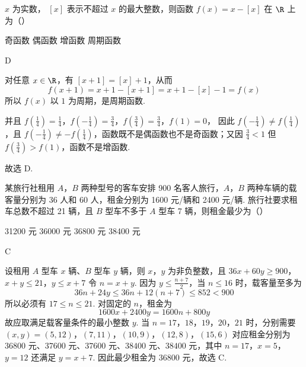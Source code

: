 \begin{problem}
\(x\) 为实数， \([x]\) 表示不超过 \(x\) 的最大整数，则函数 \(f(x) = x - [x]\) 在 \(\R\) 上为（\quad）

\choices
    {奇函数}
    {偶函数}
    {增函数}
    {周期函数}
\end{problem}

\begin{answer}
D
\end{answer}

\begin{solution}
对任意 \(x\in\R\)，有 \([x+1]=[x]+1\)，从而
\[
 f(x+1)=x+1-[x+1]=x+1-[x]-1=f(x)
\]
所以 \(f(x)\) 以 \(1\) 为周期，是周期函数.

并且
\(f\left(\frac14\right)=\frac14\)，\(f\left(-\frac14\right)=\frac34\)，\(f\left(\frac34\right)=\frac34\)，\(f(1)=0\)，
因此 \(f\left(-\frac14\right)\ne f\left(\frac14\right)\)，且
\(f\left(-\frac14\right)\ne-f\left(\frac14\right)\)，函数既不是偶函数也不是奇函数；又因
\(\frac34<1\) 但 \(f\left(\frac34\right)>f(1)\)，函数不是增函数.

故选 D.
\end{solution}

\begin{problem}
某旅行社租用 \(A\)，\(B\) 两种型号的客车安排 900 名客人旅行，\(A\)，\(B\) 两种车辆的载客量分别为 36 人和 60 人，租金分别为 1600 元/辆和 2400 元/辆. 旅行社要求租车总数不超过 21 辆，且 \(B\) 型车不多于 \(A\) 型车 7 辆，则租金最少为（\quad）

\choices
    {31200 元}
    {36000 元}
    {36800 元}
    {38400 元}
\end{problem}

\begin{answer}
C
\end{answer}

\begin{solution}
设租用 \(A\) 型车 \(x\) 辆、\(B\) 型车 \(y\) 辆，则 \(x\)，\(y\) 为非负整数，且
\(36x+60y\geqslant900\)，\(x+y\leqslant21\)，\(y\leqslant x+7\)
令 \(n=x+y\). 因为 \(y\leqslant\frac{n+7}{2}\)，当 \(n\leqslant16\) 时，载客量至多为
\[
 36n+24y\leqslant36n+12(n+7)\leqslant852<900
\]
所以必须有 \(17\leqslant n\leqslant21\). 对固定的 \(n\)，租金为
\[
 1600x+2400y=1600n+800y
\]
故应取满足载客量条件的最小整数 \(y\). 当 \(n=17\)，\(18\)，\(19\)，\(20\)，\(21\) 时，分别需要
\((x,y)=(5,12)\)，\((7,11)\)，\((10,9)\)，\((12,8)\)，\((15,6)\)
对应租金分别为 \(36800\) 元、\(37600\) 元、\(37600\) 元、\(38400\) 元、\(38400\) 元，其中 \(n=17\)，\(x=5\)，\(y=12\) 还满足 \(y=x+7\). 因此最少租金为 \(36800\) 元，故选 C.
\end{solution}


